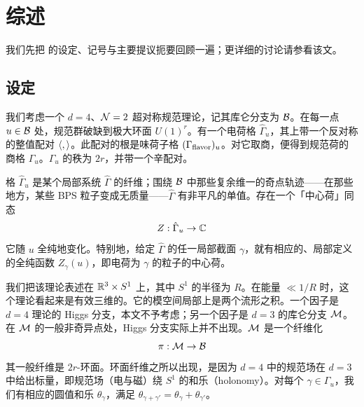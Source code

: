 
\section{综述}
\label{sec:review}

我们先把 \cite{Gaiotto:2008cd} 的设定、记号与主要提议扼要回顾一遍；更详细的讨论请参看该文。

\subsection{设定}

我们考虑一个 $d=4$、$\mathcal{N}=2$ 超对称规范理论，记其库仑分支为 $\mathcal{B}$。在每一点 $u \in \mathcal{B}$ 处，规范群破缺到极大环面 $U(1)^r$。有一个电荷格 $\hat\Gamma_u$，其上带一个反对称的整值配对 $\langle , \rangle$。此配对的根是味荷子格 $(\Gamma_{\rm flavor})_u$。对它取商，便得到规范荷的商格 $\Gamma_u$。$\Gamma_u$ 的秩为 $2r$，并带一个辛配对。

格 $\hat\Gamma_u$ 是某个局部系统 $\hat\Gamma$ 的纤维；围绕 $\mathcal{B}$ 中那些复余维一的奇点轨迹——在那些地方，某些 BPS 粒子变成无质量——$\hat\Gamma$ 有非平凡的单值。存在一个「中心荷」同态
\begin{equation}
Z: \hat\Gamma_u \to \mathbb{C} \label{ch2:eq:central-charge}
\end{equation}
它随 $u$ 全纯地变化。特别地，给定 $\hat\Gamma$ 的任一局部截面 $\gamma$，就有相应的、局部定义的全纯函数 $Z_\gamma(u)$，即电荷为 $\gamma$ 的粒子的中心荷。

我们把该理论表述在 $\mathbb{R}^3 \times S^1$ 上，其中 $S^1$ 的半径为 $R$。在能量 $\ll 1/R$ 时，这个理论看起来是有效三维的。它的模空间局部上是两个\hk 流形之积。一个因子是 $d=4$ 理论的 Higgs 分支，本文不予考虑；另一个因子是 $d=3$ 的库仑分支 $\mathcal{M}$。在 $\mathcal{M}$ 的一般非奇异点处，Higgs 分支实际上并不出现。$\mathcal{M}$ 是一个纤维化
\begin{equation}
\pi: \mathcal{M} \to \mathcal{B} \label{ch2:eq:fibration}
\end{equation}
其一般纤维是 $2r$-环面。环面纤维之所以出现，是因为 $d=4$ 中的规范场在 $d=3$ 中给出标量，即规范场（电与磁）绕 $S^1$ 的和乐（holonomy）。对每个 $\gamma \in \Gamma_u$，我们有相应的圆值和乐 $\theta_\gamma$，满足 $\theta_{\gamma+\gamma'} = \theta_\gamma + \theta_{\gamma'}$。

